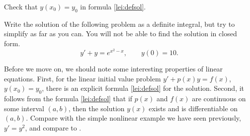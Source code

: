 \begin{exercise}
Check that $y(x_0) = y_0$ in formula \eqref{lei:defsol}.
\end{exercise}

\begin{exercise}
Write the solution of the following problem
as a definite integral, but try to simplify as far as you can.  You will not
be able to find the solution in closed form.
\begin{equation*}
y' + y = e^{x^2-x}, \qquad y(0) = 10 .
\end{equation*}
\end{exercise}

\begin{remark}
Before we move on, we should note some interesting properties of linear
equations.  First, for the linear initial value problem
$y' + p(x) y = f(x)$, $y(x_0) = y_0$,
there is an explicit formula \eqref{lei:defsol} for the
solution.  Second, it follows
from the formula \eqref{lei:defsol} that if $p(x)$
and $f(x)$ are continuous on some interval $(a,b)$, then the
solution $y(x)$ exists and is differentiable on $(a,b)$.  Compare
with the simple nonlinear example we have seen previously, $y'=y^2$,
and compare to .
\end{remark}


